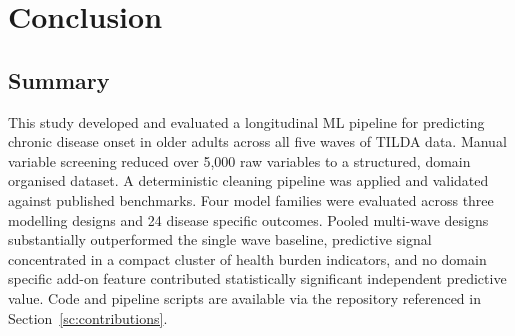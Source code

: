 
\chapter{Conclusion}\label{ch:chapter6}



\ifpdf
    \graphicspath{{6_conclusions/figures/PNG/}{6_conclusions/figures/PDF/}{6_conclusions/figures/}}
\else
    \graphicspath{{6_conclusions/figures/EPS/}{6_conclusions/figures/}}
\fi




\section{Summary}
This study developed and evaluated a longitudinal \gls{ML} pipeline for predicting chronic disease onset in older adults across all five waves of \gls{TILDA} data. Manual variable screening reduced over 5,000 raw variables to a structured, domain organised dataset. A deterministic cleaning pipeline was applied and validated against published benchmarks. Four model families were evaluated across three modelling designs and 24 disease specific outcomes. Pooled multi-wave designs substantially outperformed the single wave baseline, predictive signal concentrated in a compact cluster of health burden indicators, and no domain specific add-on feature contributed statistically significant independent predictive value. Code and pipeline scripts are available via the repository referenced in Section~\ref{sc:contributions}.

